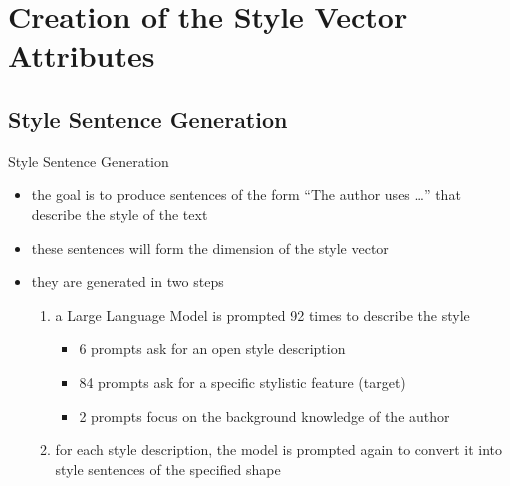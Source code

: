 \documentclass[]{beamer}
\begin{document}
\section{Creation of the Style Vector Attributes}
\subsection{Style Sentence Generation}
\begin{frame}{Style Sentence Generation}
  \begin{itemize}
    \item the goal is to produce sentences of the form \enquote{The author uses \ldots} that describe the style of the text
    \item these sentences will form the dimension of the style vector
    \item they are generated in two steps
          \pause
          \begin{enumerate}
            \item a Large Language Model is prompted \num{92} times to describe the style
                  \begin{itemize}
                    \item \num{6} prompts ask for an open style description
                    \item \num{84} prompts ask for a specific stylistic feature (target)
                    \item \num{2} prompts focus on the background knowledge of the author
                  \end{itemize}
                  \pause
            \item for each style description, the model is prompted again to convert it into style sentences of the specified shape
          \end{enumerate}
  \end{itemize}
\end{frame}

\begin{frame}[shrink]
  
\end{frame}
\begin{frame}[shrink]
  
\end{frame}
\end{document}
